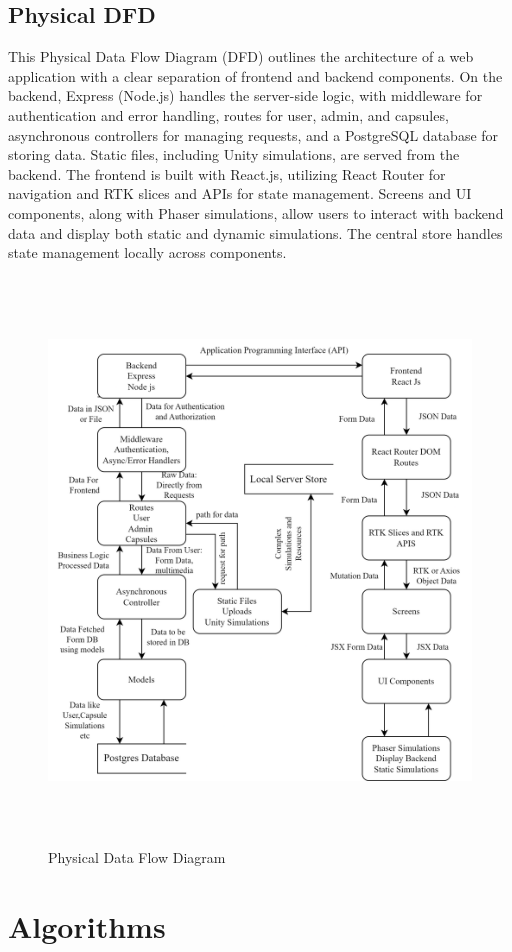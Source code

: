 \subsection{Physical DFD}
This Physical Data Flow Diagram (DFD) outlines the architecture of a web application with a clear separation of frontend and backend components. On the backend, Express (Node.js) handles the server-side logic, with middleware for authentication and error handling, routes for user, admin, and capsules, asynchronous controllers for managing requests, and a PostgreSQL database for storing data. Static files, including Unity simulations, are served from the backend. The frontend is built with React.js, utilizing React Router for navigation and RTK slices and APIs for state management. Screens and UI components, along with Phaser simulations, allow users to interact with backend data and display both static and dynamic simulations. The central store handles state management locally across components.
\begin{figure}[H]
    \centering
    \includegraphics[height = 15cm]{Diagrams/DFD Process Modeling.png}
    \caption{Physical Data Flow Diagram}
\end{figure}
\newpage
\section{Algorithms}

